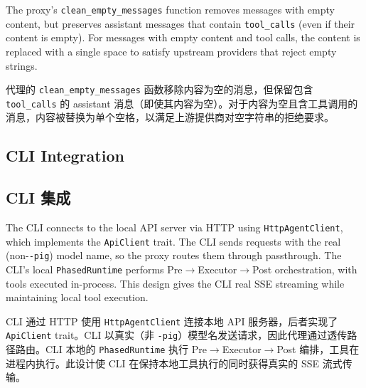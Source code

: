 The proxy's \texttt{clean\_empty\_messages} function removes messages with empty content, but preserves assistant messages that contain \texttt{tool\_calls} (even if their content is empty). For messages with empty content and tool calls, the content is replaced with a single space to satisfy upstream providers that reject empty strings.
\begin{chinese}
代理的 \texttt{clean\_empty\_messages} 函数移除内容为空的消息，但保留包含 \texttt{tool\_calls} 的 assistant 消息（即使其内容为空）。对于内容为空且含工具调用的消息，内容被替换为单个空格，以满足上游提供商对空字符串的拒绝要求。
\end{chinese}

\subsection{CLI Integration}
\begin{chinese}
\subsection{CLI 集成}
\end{chinese}

The CLI connects to the local API server via HTTP using \texttt{HttpAgentClient}, which implements the \texttt{ApiClient} trait. The CLI sends requests with the real (non-\texttt{-pig}) model name, so the proxy routes them through passthrough. The CLI's local \texttt{PhasedRuntime} performs Pre$\rightarrow$Executor$\rightarrow$Post orchestration, with tools executed in-process. This design gives the CLI real SSE streaming while maintaining local tool execution.
\begin{chinese}
CLI 通过 HTTP 使用 \texttt{HttpAgentClient} 连接本地 API 服务器，后者实现了 \texttt{ApiClient} trait。CLI 以真实（非 \texttt{-pig}）模型名发送请求，因此代理通过透传路径路由。CLI 本地的 \texttt{PhasedRuntime} 执行 Pre$\rightarrow$Executor$\rightarrow$Post 编排，工具在进程内执行。此设计使 CLI 在保持本地工具执行的同时获得真实的 SSE 流式传输。
\end{chinese}
